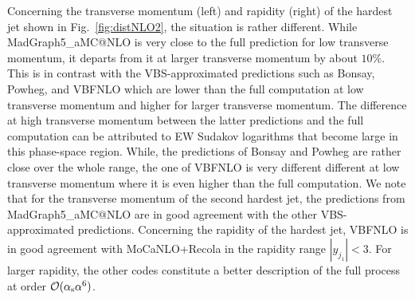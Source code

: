 Concerning the transverse momentum (left) and rapidity (right) of the hardest jet shown in Fig.~\ref{fig:distNLO2}, the situation is rather different.
While {\sc MadGraph5\_aMC\-@NLO} is very close to the full prediction for low transverse momentum, it departs from it 
at larger transverse momentum by about $10\%$.
This is in contrast with the VBS-approximated predictions such as {\sc Bonsay}, {\sc Powheg}, and {\sc VBFNLO} which are lower than the full computation at low transverse momentum and higher for larger transverse momentum.
The difference at high transverse momentum between the latter predictions and the full computation can be attributed to EW Sudakov logarithms that become large in this phase-space region.
While, the predictions of {\sc Bonsay} and {\sc Powheg} are rather close over the whole range, the one of {\sc VBFNLO} is very different different at low transverse momentum where it is even higher than the full computation.
We note that for the transverse momentum of the second hardest jet, the predictions from {\sc MadGraph5\_aMC\-@NLO} are in good agreement with the other VBS-approximated predictions.
Concerning the rapidity of the hardest jet, {\sc VBFNLO} is in good agreement with {\sc MoCaNLO}+{\sc Recola} in the rapidity range $|y_{j_1}| < 3$.
For larger rapidity, the other codes constitute a better description of the full process at order $\mathcal{O}(\alpha_{\rm s}\alpha^6)$.

